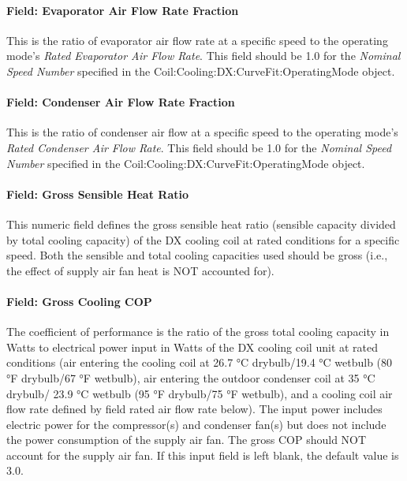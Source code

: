 \paragraph{Field: Evaporator Air Flow Rate Fraction}\label{field-evaporator-air-flow-rate-fraction}

This is the ratio of evaporator air flow rate at a specific speed to the operating mode's \textit{Rated Evaporator Air Flow Rate}. This field should be 1.0 for the \textit{Nominal Speed Number} specified in the Coil:Cooling:DX:CurveFit:OperatingMode object.

\paragraph{Field: Condenser Air Flow Rate Fraction}\label{field-condenser-air-flow-rate-fraction}

This is the ratio of condenser air flow at a specific speed to the operating mode's \textit{Rated Condenser Air Flow Rate}. This field should be 1.0 for the \textit{Nominal Speed Number} specified in the Coil:Cooling:DX:CurveFit:OperatingMode object.

\paragraph{Field: Gross Sensible Heat Ratio}\label{field-gross-sensible-heat-ratio}

This numeric field defines the gross sensible heat ratio (sensible capacity divided by total cooling capacity) of the DX cooling coil at rated conditions for a specific speed. Both the sensible and total cooling capacities used should be gross (i.e., the effect of supply air fan heat is NOT accounted for).

\paragraph{Field: Gross Cooling COP}

The coefficient of performance is the ratio of the gross total cooling capacity in Watts to electrical power input in Watts of the DX cooling coil unit at rated conditions (air entering the cooling coil at 26.7 °C drybulb/19.4 °C wetbulb (80 °F drybulb/67 °F wetbulb), air entering the outdoor condenser coil at 35 °C drybulb/ 23.9 °C wetbulb (95 °F drybulb/75 °F wetbulb), and a cooling coil air flow rate defined by field rated air flow rate below). The input power includes electric power for the compressor(s) and condenser fan(s) but does not include the power consumption of the supply air fan. The gross COP should NOT account for the supply air fan. If this input field is left blank, the default value is 3.0.

